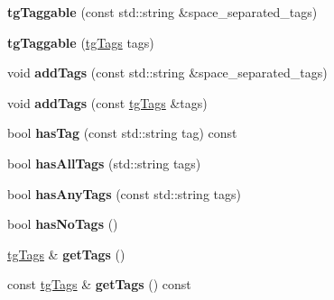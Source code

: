 \begin{DoxyCompactItemize}
\item 
\hypertarget{classtg_taggable_a04951540329c334382978c93715be26e}{{\bfseries tg\-Taggable} (const std\-::string \&space\-\_\-separated\-\_\-tags)}\label{classtg_taggable_a04951540329c334382978c93715be26e}

\item 
\hypertarget{classtg_taggable_a7e49bac9a35685f1420c347336dd9c99}{{\bfseries tg\-Taggable} (\hyperlink{classtg_tags}{tg\-Tags} tags)}\label{classtg_taggable_a7e49bac9a35685f1420c347336dd9c99}

\item 
\hypertarget{classtg_taggable_af0b8f1729653b0b90d2fecbd51163612}{void {\bfseries add\-Tags} (const std\-::string \&space\-\_\-separated\-\_\-tags)}\label{classtg_taggable_af0b8f1729653b0b90d2fecbd51163612}

\item 
\hypertarget{classtg_taggable_af28e3fe1a7e4eb28772dc006d575dd1f}{void {\bfseries add\-Tags} (const \hyperlink{classtg_tags}{tg\-Tags} \&tags)}\label{classtg_taggable_af28e3fe1a7e4eb28772dc006d575dd1f}

\item 
\hypertarget{classtg_taggable_ae31f65869c8887bfeb34a344902c4d5b}{bool {\bfseries has\-Tag} (const std\-::string tag) const }\label{classtg_taggable_ae31f65869c8887bfeb34a344902c4d5b}

\item 
\hypertarget{classtg_taggable_a33b77b1075171b63f673965687b2e844}{bool {\bfseries has\-All\-Tags} (std\-::string tags)}\label{classtg_taggable_a33b77b1075171b63f673965687b2e844}

\item 
\hypertarget{classtg_taggable_af14af28fa98021c4f20a5e8f2ddd5606}{bool {\bfseries has\-Any\-Tags} (const std\-::string tags)}\label{classtg_taggable_af14af28fa98021c4f20a5e8f2ddd5606}

\item 
\hypertarget{classtg_taggable_adff345e116e16420c701a748ff8f995f}{bool {\bfseries has\-No\-Tags} ()}\label{classtg_taggable_adff345e116e16420c701a748ff8f995f}

\item 
\hypertarget{classtg_taggable_acf1d7fa9df8f374f25015c4080902681}{\hyperlink{classtg_tags}{tg\-Tags} \& {\bfseries get\-Tags} ()}\label{classtg_taggable_acf1d7fa9df8f374f25015c4080902681}

\item 
\hypertarget{classtg_taggable_ae70d7d3b45301665bc363b0ed8b9b292}{const \hyperlink{classtg_tags}{tg\-Tags} \& {\bfseries get\-Tags} () const }\label{classtg_taggable_ae70d7d3b45301665bc363b0ed8b9b292}


\end{DoxyCompactItemize}

